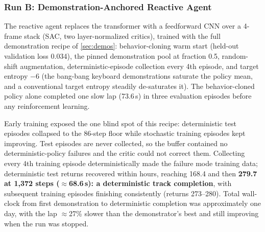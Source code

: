 \documentclass[conference]{IEEEtran}
\begin{document}
\subsubsection{Run B: Demonstration-Anchored Reactive Agent}
\label{sec:runb}
The reactive agent replaces the transformer with a feedforward CNN over a 4-frame stack (SAC, two layer-normalized critics), trained with the full demonstration recipe of \cref{sec:demos}: behavior-cloning warm start (held-out validation loss 0.034), the pinned demonstration pool at fraction 0.5, random-shift augmentation, deterministic-episode collection every 4th episode, and target entropy $-6$ (the bang-bang keyboard demonstrations saturate the policy mean, and a conventional target entropy steadily de-saturates it). The behavior-cloned policy alone completed one slow lap (73.6\,s) in three evaluation episodes before any reinforcement learning.

Early training exposed the one blind spot of this recipe: deterministic test episodes collapsed to the 86-step floor while stochastic training episodes kept improving. Test episodes are never collected, so the buffer contained no deterministic-policy failures and the critic could not correct them. Collecting every 4th training episode deterministically made the failure mode training data; deterministic test returns recovered within hours, reaching 168.4 and then \textbf{279.7 at 1{,}372 steps ($\approx$68.6\,s): a deterministic track completion}, with subsequent training episodes finishing consistently (returns 273--280). Total wall-clock from first demonstration to deterministic completion was approximately one day, with the lap $\approx$27\% slower than the demonstrator's best and still improving when the run was stopped.
\end{document}
